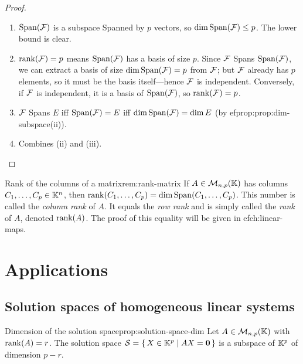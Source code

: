 \begin{proof}
\begin{enumerate}[label=(\roman*)]
  \item $\operatorname{Span}({\mathcal{F}})$ is a subspace Spanned by $p$ vectors, so
    $\dim\operatorname{Span}({\mathcal{F}})\leq p$. The lower bound is clear.

  \item $\operatorname{rank}({\mathcal{F}}) = p$ means $\operatorname{Span}({\mathcal{F}})$ has a basis of size $p$.
    Since ${\mathcal{F}}$ Spans $\operatorname{Span}({\mathcal{F}})$, we can extract a basis of size
    $\dim\operatorname{Span}({\mathcal{F}})=p$ from ${\mathcal{F}}$; but ${\mathcal{F}}$ already has $p$ elements,
    so it must be the basis itself---hence ${\mathcal{F}}$ is independent.
    Conversely, if ${\mathcal{F}}$ is independent, it is a basis of $\operatorname{Span}({\mathcal{F}})$,
    so $\operatorname{rank}({\mathcal{F}})=p$.

  \item ${\mathcal{F}}$ Spans $E$ iff $\operatorname{Span}({\mathcal{F}}) = E$ iff
    $\dim\operatorname{Span}({\mathcal{F}})=\dim E$ (by 
ef{prop:prop:dim-subspace}(ii)).

  \item Combines (ii) and (iii). \qedhere
\end{enumerate}
\end{proof}

\begin{remark}{Rank of the columns of a matrix}{rem:rank-matrix}
If $A\in\mathcal{M}_{n,p}({\mathbb{K}})$ has columns $C_1,\ldots,C_p\in{\mathbb{K}}^n$, then
$\operatorname{rank}(C_1,\ldots,C_p) = \dim\operatorname{Span}(C_1,\ldots,C_p)$. This number is
called the \emph{column rank} of $A$. It equals the \emph{row rank} and
is simply called the \emph{rank} of $A$, denoted $\operatorname{rank}(A)$. The proof
of this equality will be given in 
ef{ch:linear-maps}.
\end{remark}


\section{Applications}\label{sec:vs-applications}

\subsection{Solution spaces of homogeneous linear
systems}\label{subsec:solution-spaces}

\begin{proposition}{Dimension of the solution space}{prop:solution-space-dim}
Let $A\in\mathcal{M}_{n,p}({\mathbb{K}})$ with $\operatorname{rank}(A)=r$. The solution space
${\mathcal{S}} = \left\{\,X\in{\mathbb{K}}^p\;\middle|\;AX=\mathbf{0}\,\right\}$ is a subspace of ${\mathbb{K}}^p$ of
dimension $p - r$.
\end{proposition}


